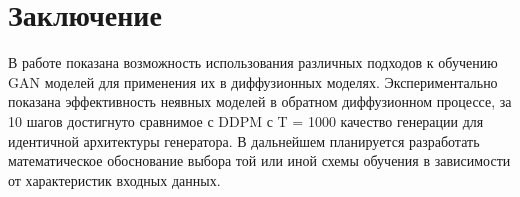 \documentclass{article}
\begin{document}
\section{Заключение}
В работе показана возможность использования различных подходов к обучению GAN моделей для применения их в диффузионных моделях. Экспериментально показана эффективность неявных моделей в обратном диффузионном процессе, за 10 шагов достигнуто сравнимое с DDPM с T = 1000 качество генерации для идентичной архитектуры генератора. В дальнейшем планируется разработать математическое обоснование выбора той или иной схемы обучения в зависимости от характеристик входных данных. 




\end{document}
